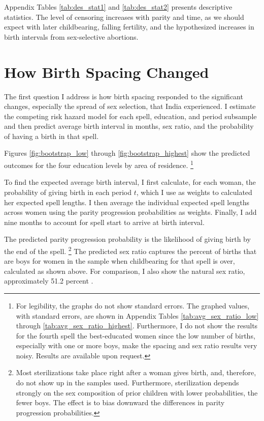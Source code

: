 \documentclass[12pt,letterpaper]{article}
\begin{document}
Appendix Tables \ref{tab:des_stat1} and \ref{tab:des_stat2} presents descriptive 
statistics.
The level of censoring increases with parity and time, as we should expect with later 
childbearing, falling fertility, and the hypothesized increases in birth intervals from 
sex-selective abortions.



\section{How Birth Spacing Changed\label{sec:results}}

The first question I address is how birth spacing responded to the significant changes, 
especially the spread of sex selection, that India experienced. 
I estimate the competing risk hazard model for each spell, education, and period 
subsample and then predict average birth interval in months, sex ratio, and the 
probability of having a birth in that spell.

Figures \ref{fig:bootstrap_low} through \ref{fig:bootstrap_highest}
show the predicted outcomes for the four education levels by area of residence.%
\footnote{
For legibility, the graphs do not show standard errors.
The graphed values, with standard errors, are shown in Appendix Tables 
\ref{tab:avg_sex_ratio_low} through \ref{tab:avg_sex_ratio_highest}.
Furthermore, I do not show the results for the fourth spell the best-educated women since 
the low number of births, especially with one or more boys, make the spacing and sex ratio 
results very noisy.
Results are available upon request.
}

To find the expected average birth interval, I first calculate, for each woman, 
the probability of giving birth in each period $t$, which I use as weights to calculated 
her expected spell lengths. 
I then average the individual expected spell lengths across women using the parity 
progression probabilities as weights.
Finally, I add nine months to account for spell start to arrive at birth interval.

The predicted parity progression probability is the likelihood of giving birth by the
end of the spell.%
\footnote{
Most sterilizations take place right after a woman gives birth, and,
therefore, do not show up in the samples used. 
Furthermore, sterilization depends strongly on the sex composition of prior children
with lower probabilities, the fewer boys. 
The effect is to bias downward the differences in parity progression probabilities.
}
The predicted sex ratio captures the percent of births that are boys for women in 
the sample when childbearing for that spell is over, calculated as shown above.
For comparison, I also show the natural sex ratio, approximately 51.2 percent 
\citep{ben-porath76b,jacobsen99,Portner2015b}.
\end{document}
